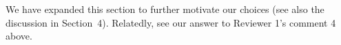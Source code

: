 \documentclass[12pt,a4paper]{article}
\begin{document}
We have expanded this section to further motivate our choices (see also the discussion in Section~4). Relatedly, see our answer to Reviewer 1's comment 4 above.

%
%
%
%
%





\end{document}
